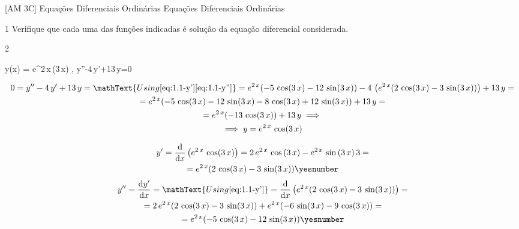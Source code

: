 \documentclass["./AM3C.exercises_resolutions.2024.tex"]{subfiles}
\begin{document}
\graphicspath{{\subfix{.build/figures/AM3C.exercises_resolutions.2024.1}}}

[AM 3C]
{Equações Diferenciais Ordinárias} %
{Equações Diferenciais Ordinárias} %

\begin{questionBox}1{} %
  Verifique que cada uma das funções indicadas é solução da equação diferencial considerada.
\end{questionBox}

\begin{questionBox}2{} %

  \begin{BM}
    y(x) = e^{2\,x}\,\cos(3\,x)
    ,\quad
    y''-4\,y'+13\,y=0
  \end{BM}

  \answer{}

  \begin{gather*}
    0
    = y'' - 4\,y' + 13\,y
    = \mathText{Using 
      \eqref{eq:1.1-y'}
      \eqref{eq:1.1-y''}
    }
    = e^{2\,x}(
      -5\,\cos(3\,x)
      -12\,\sin(3\,x)
    )
    - 4\,\left(
      e^{2\,x}(
        2\,\cos(3\,x) -3\,\sin(3\,x)
      )
    \right)
    + 13\,y
    = \\
    = e^{2\,x}(
      -5\,\cos(3\,x)
      -12\,\sin(3\,x)
      -8\,\cos(3\,x) 
      +12\,\sin(3\,x)
    )
    + 13\,y
    = \\
    = e^{2\,x}(
      -13\,\cos(3\,x)
    )
    + 13\,y
    \implies \\
    \implies
    y = e^{2\,x}\,\cos(3\,x)
  \end{gather*}

  \begin{gather*}
    y'
    = \odv{}{x}
    \left( e^{2\,x}\,\cos(3\,x) \right)
    = 2\,e^{2\,x}\,\cos{(3\,x)}
    - e^{2\,x}\,\sin{(3\,x)}\,3
    = \\
    = e^{2\,x}(
      2\,\cos(3\,x) -3\,\sin(3\,x)
    )
    \yesnumber\label{eq:1.1-y'}
  \end{gather*}
  \begin{gather*}
    y''
    = \odv{y'}{x}
    = \mathText{Using \eqref{eq:1.1-y'}}
    = \odv{}{x}\left(
      e^{2\,x}(
        2\,\cos(3\,x) -3\,\sin(3\,x)
      )
    \right)
    = \\
    = 2\,e^{2\,x}(
      2\,\cos(3\,x) -3\,\sin(3\,x)
    )
    + e^{2\,x}(
      -6\,\sin(3\,x)
      -9\,\cos(3\,x)
    )
    = \\
    = e^{2\,x}(
      -5\,\cos(3\,x)
      -12\,\sin(3\,x)
    )
    \yesnumber\label{eq:1.1-y''}
  \end{gather*}

\end{questionBox}
\end{document}
